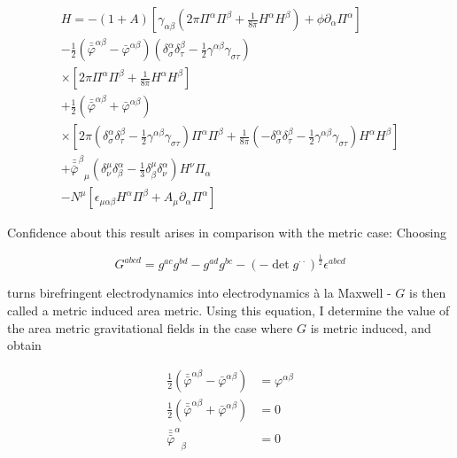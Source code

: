 \documentclass[11pt]{article}
\begin{document}
\begin{equation} \label{geld_pert_ham}
	\begin{split}
		H = 
		- \left( 1 + A \right) 
		\left[
		\gamma_{\alpha \beta}
		\left( 
		2 \pi \Pi^\alpha \Pi^\beta
		+ \frac{1}{8 \pi} H^\alpha H^\beta 
		\right)
		+ \phi \partial_\alpha \Pi^\alpha
		\right] \\
		- \frac{1}{2} \left( 
		\bar{\bar{\varphi}}^{\alpha \beta} 
		- \bar{\varphi}^{\alpha \beta}
		\right)
		 \left( 
		 \delta^\alpha_\sigma \delta^\beta_\tau 
		- \frac{1}{2} \gamma^{\alpha \beta } \gamma_{\sigma \tau} 
		\right) \\
		\times \left[
		2 \pi 
		\Pi^\alpha \Pi^\beta
		+ \frac{1}{8 \pi} 
		H^\alpha H^\beta 
		\right] \\
		+ \frac{1}{2} \left( 
		\bar{\bar{\varphi}}^{\alpha \beta} 
		+ \bar{\varphi}^{\alpha \beta}
		\right) \\
		\times \left[
		2 \pi 
		\left( 
		\delta^\alpha_\sigma \delta^\beta_\tau 
		- \frac{1}{2} \gamma^{\alpha \beta } \gamma_{\sigma \tau} 
		\right)
		\Pi^\alpha \Pi^\beta
		+ \frac{1}{8 \pi} 
		 \left( 
		- \delta^\alpha_\sigma \delta^\beta_\tau 
		- \frac{1}{2} \gamma^{\alpha \beta } \gamma_{\sigma \tau} 
		\right)
		H^\alpha H^\beta 
		\right] \\
		+ {\bar{\bar{\bar{\varphi}}}^\beta}_\mu 
		\left(
		\delta^{\mu}_\nu \delta^\alpha_\beta 
		- \frac{1}{3}\delta^{\mu}_\beta \delta^\alpha_\nu
		\right) H^\nu \Pi_\alpha \\
		- N^\mu
		\left[
		\epsilon_{\mu \alpha \beta} H^\alpha \Pi^\beta
		+ A_\mu \partial_\alpha \Pi^\alpha
		\right]
	\end{split}
\end{equation}

Confidence about this result arises in comparison with the metric case: Choosing

\begin{equation}
	G^{a b c d} = 
	g^{a c} g^{b d} - g^{a d}g^{b c} 
	- \left(
	-\det{g^{\cdot \cdot}}
	\right) ^{\frac{1}{2}}
	\epsilon^{ a b c d}
\end{equation}

turns birefringent electrodynamics into electrodynamics à la Maxwell - $G$ is then called a metric induced area metric. Using this equation, I determine the value of the area metric gravitational fields in the case where $G$ is metric induced, and obtain

\begin{align}
	\frac{1}{2} 
	\left( 
	\bar{\bar{\varphi}}^{\alpha \beta} 
	- \bar{\varphi}^{\alpha \beta}
	\right) 
	&= \varphi^{\alpha \beta}\\
	\frac{1}{2} 
	\left( 
	\bar{\bar{\varphi}}^{\alpha \beta} 
	+ \bar{\varphi}^{\alpha \beta}
	\right) 
	&= 0 \\
	{\bar{\bar{\bar{\varphi}}}^\alpha}_\beta 
	&= 0
\end{align}
\end{document}
